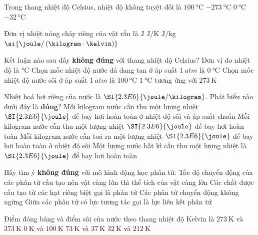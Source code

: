 \begin{ex}
	Trong thang nhiệt độ Celsius, nhiệt độ không tuyệt đối là
	\choice
	{$\SI{100}{\celsius}$}
	{\True $\SI{-273}{\celsius}$}
	{$\SI{0}{\celsius}$}
	{$\SI{-32}{\celsius}$}
	\loigiai{}
\end{ex}
\begin{ex}
	Đơn vị nhiệt nóng chảy riêng của vật rắn là
	\choice
	{$\si{\joule}$}
	{$\si{\joule/\kelvin}$}
	{\True $\si{\joule/\kilogram}$}
	{$\si{\joule/\left(\kilogram\cdot\kelvin\right)}$}
	\loigiai{}
\end{ex}

\begin{ex}
	Kết luận nào sau đây \textbf{không đúng} với thang nhiệt độ Celsius?
	\choice
	{Đơn vị đo nhiệt độ là $\si{\celsius}$}
	{Chọn mốc nhiệt độ nước đá đang tan ở áp suất $\SI{1}{atm}$ là $\SI{0}{\celsius}$}
	{Chọn mốc nhiệt độ nước sôi ở áp suất $\SI{1}{atm}$ là $\SI{100}{\celsius}$}
	{\True $\SI{1}{\celsius}$ tương ứng với $\SI{273}{\kelvin}$}
	\loigiai{}
\end{ex}
\begin{ex}
	Nhiệt hoá hơi riêng của nước là $\SI{2.3E6}{\joule/\kilogram}$. Phát biểu nào dưới đây là \textbf{đúng}?
	\choice
	{\True Mỗi kilogram nước cần thu một lượng nhiệt $\SI{2.3E6}{\joule}$ để bay hơi hoàn toàn ở nhiệt độ sôi và áp suất chuẩn}
	{Mỗi kilogram nước cần thu một lượng nhiệt $\SI{2.3E6}{\joule}$ để bay hơi hoàn toàn}
	{Mỗi kilogram nước cần toả ra một lượng nhiệt $\SI{2.3E6}{\joule}$ để bay hơi hoàn toàn ở nhiệt độ sôi}
	{Một lượng nước bất kì cần thu một lượng nhiệt là $\SI{2.3E6}{\joule}$ để bay hơi hoàn toàn}
	\loigiai{}
\end{ex}
\begin{ex}
	Hãy tìm ý \textbf{không đúng} với mô hình động học phân tử.
	\choice
	{\True Tốc độ chuyển động của các phân tử cấu tạo nên vật càng lớn thì thể tích của vật càng lớn}
	{Các chất được cấu tạo từ các hạt riêng biệt gọi là phân tử}
	{Các phân tử chuyển động không ngừng}
	{Giữa các phân tử có lực tương tác gọi là lực liên kết phân tử}
	\loigiai{}
\end{ex}
\begin{ex}
	Điểm đóng băng và điểm sôi của nước theo thang nhiệt độ Kelvin là
	\choice
	{\True $\SI{273}{\kelvin}$ và $\SI{373}{\kelvin}$}
	{$\SI{0}{\kelvin}$ và $\SI{100}{\kelvin}$}
	{$\SI{73}{\kelvin}$ và $\SI{37}{\kelvin}$}
	{$\SI{32}{\kelvin}$ và $\SI{212}{\kelvin}$}
	\loigiai{}
\end{ex}
